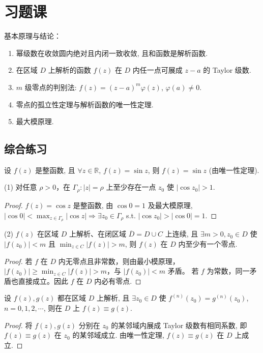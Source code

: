 \documentclass[theorem=false,mathfont=none,openany,sub3section]{easybook}
\begin{document}
\section{习题课}

基本原理与结论：
\begin{enumerate}
  \item 幂级数在收敛圆内绝对且内闭一致收敛, 且和函数是解析函数.
  \item 在区域 $D$ 上解析的函数 $f(z)$ 在 $D$ 内任一点可展成 $z-a$ 的 Taylor 级数.
  \item $m$ 级零点的判别法: $f(z)=(z-a)^{m}\varphi(z)$, $\varphi(a)\neq0$.
  \item 零点的孤立性定理与解析函数的唯一性定理.
  \item 最大模原理.
\end{enumerate}

\subsection{综合练习}

\begin{example}
  设 $f(z)$ 是整函数, 且 $\forall z\in\mathbb{R}$, $f(z)=\sin z$, 则 $f(z)=\sin z$ (由唯一性定理).
\end{example}

\begin{example}
  (1) 对任意 $\rho>0$，在 $\Gamma_{\rho}:|z|=\rho$ 上至少存在一点 $z_{0}$ 使 $|\cos z_{0}|>1$.
  \begin{proof}
    $f(z)=\cos z$ 是整函数, 由 $\cos0=1$ 及最大模原理,
    $|\cos0|<\max_{z\in\Gamma_{\rho}}|\cos z|\Rightarrow\exists z_{0}\in\Gamma_{\rho}$ s.t. $|\cos z_{0}|>|\cos0|=1$.
  \end{proof}

  (2) $f(z)$ 在区域 $D$ 上解析、在闭区域 $\overline{D}=D\cup C$ 上连续,
  且 $\exists m>0,z_{0}\in D$ 使 $|f(z_{0})|<m$ 且
  $\min_{z\in C}|f(z)|>m$, 则 $f(z)$ 在 $D$ 内至少有一个零点.
  \begin{proof}
    若 $f$ 在 $D$ 内无零点且非常数，则由最小模原理，
    $|f(z_{0})|\geq\min_{z\in C}|f(z)|>m$，与 $|f(z_{0})|<m$ 矛盾。
    若 $f$ 为常数，同一矛盾也直接成立。因此 $f$ 在 $D$ 内必有零点.
  \end{proof}
\end{example}

\begin{example}
  设 $f(z),g(z)$ 都在区域 $D$ 上解析, 且 $\exists z_{0}\in D$ 使
  $f^{(n)}(z_{0})=g^{(n)}(z_{0})$, $n=0,1,2,\cdots$, 则在 $D$ 上
  $f(z)\equiv g(z)$.\par
  \begin{proof}
    将 $f(z),g(z)$ 分别在 $z_{0}$ 的某邻域内展成 Taylor 级数有相同系数, 即 $f(z)\equiv g(z)$ 在 $z_{0}$ 的某邻域成立. 由唯一性定理, $f(z)\equiv g(z)$ 在 $D$ 上成立.
  \end{proof}
\end{example}
\end{document}
